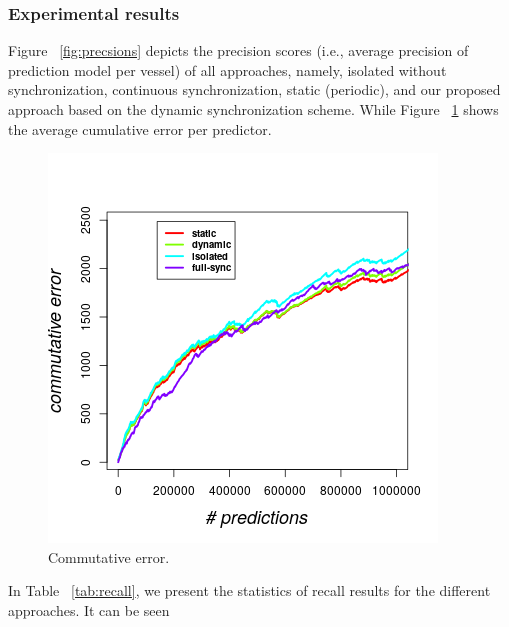 \subsubsection*{Experimental results} Figure ~\ref{fig:precsions} depicts the precision scores (i.e., average precision of prediction model per vessel)  of all approaches, namely, isolated without synchronization, continuous synchronization, static (periodic), and our proposed approach based on the dynamic synchronization scheme. While Figure ~\ref{fig:error} shows the average cumulative error per predictor.       




\begin{figure}[]
	
	\includegraphics[width=.5\textwidth]{figures/error.png}
	
\caption{Commutative error.}
\label{fig:error}
\end{figure}

\par In Table ~\ref{tab:recall}, we present the statistics of  recall results for the different approaches. It can be seen 


